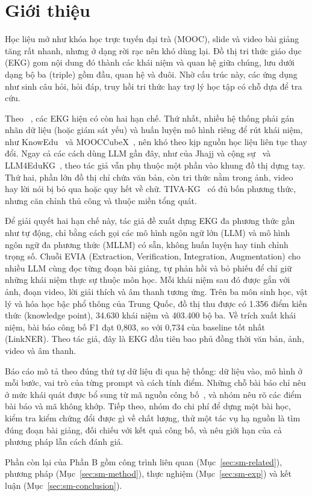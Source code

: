 \section{Giới thiệu}\label{sec:sm-intro}

Học liệu mở như khóa học trực tuyến đại trà (MOOC), slide và video bài giảng tăng rất nhanh, nhưng ở dạng rời rạc nên khó dùng lại. Đồ thị tri thức giáo dục (EKG) gom nội dung đó thành các khái niệm và quan hệ giữa chúng, lưu dưới dạng bộ ba (triple) gồm đầu, quan hệ và đuôi. Nhờ cấu trúc này, các ứng dụng như sinh câu hỏi, hỏi đáp, truy hồi tri thức hay trợ lý học tập có chỗ dựa để tra cứu.

Theo \SM{}~\cite{lu2026scimkg}, các EKG hiện có còn hai hạn chế. Thứ nhất, nhiều hệ thống phải gán nhãn dữ liệu (hoặc giám sát yếu) và huấn luyện mô hình riêng để rút khái niệm, như KnowEdu~\cite{chen2018knowedu} và MOOCCubeX~\cite{yu2021mooccubex}, nên khó theo kịp nguồn học liệu liên tục thay đổi. Ngay cả các cách dùng LLM gần đây, như của Jhajj và cộng sự~\cite{jhajj2024gptekg} và LLM4EduKG~\cite{sun2024llm4edukg}, theo tác giả vẫn phụ thuộc một phần vào khung đồ thị dựng tay. Thứ hai, phần lớn đồ thị chỉ chứa văn bản, còn tri thức nằm trong ảnh, video hay lời nói bị bỏ qua hoặc quy hết về chữ. TIVA-KG~\cite{wang2023tivakg} có đủ bốn phương thức, nhưng căn chỉnh thủ công và thuộc miền tổng quát.

Để giải quyết hai hạn chế này, tác giả đề xuất dựng EKG đa phương thức gần như tự động, chỉ bằng cách gọi các mô hình ngôn ngữ lớn (LLM) và mô hình ngôn ngữ đa phương thức (MLLM) có sẵn, không huấn luyện hay tinh chỉnh trọng số. Chuỗi EVIA (Extraction, Verification, Integration, Augmentation) cho nhiều LLM cùng đọc từng đoạn bài giảng, tự phản hồi và bỏ phiếu để chỉ giữ những khái niệm thực sự thuộc môn học. Mỗi khái niệm sau đó được gắn với ảnh, đoạn video, lời giải thích và âm thanh tương ứng. Trên ba môn sinh học, vật lý và hóa học bậc phổ thông của Trung Quốc, đồ thị thu được có 1.356 điểm kiến thức (knowledge point), 34.630 khái niệm và 403.400 bộ ba. Về trích xuất khái niệm, bài báo công bố F1 đạt 0,803, so với 0,734 của baseline tốt nhất (LinkNER). Theo tác giả, đây là EKG đầu tiên bao phủ đồng thời văn bản, ảnh, video và âm thanh.

Báo cáo mô tả \SM{} theo đúng thứ tự dữ liệu đi qua hệ thống: dữ liệu vào, mô hình ở mỗi bước, vai trò của từng prompt và cách tính điểm. Những chỗ bài báo chỉ nêu ở mức khái quát được bổ sung từ mã nguồn công bố~\cite{kgbnu2026scimkgcode}, và nhóm nêu rõ các điểm bài báo và mã không khớp. Tiếp theo, nhóm đo chi phí để dựng một bài học, kiểm tra kiểm chứng đổi được gì về chất lượng, thử một tác vụ hạ nguồn là tìm đúng đoạn bài giảng, đối chiếu với kết quả công bố, và nêu giới hạn của cả phương pháp lẫn cách đánh giá.

Phần còn lại của Phần B gồm công trình liên quan (Mục~\ref{sec:sm-related}), phương pháp (Mục~\ref{sec:sm-method}), thực nghiệm (Mục~\ref{sec:sm-exp}) và kết luận (Mục~\ref{sec:sm-conclusion}).
